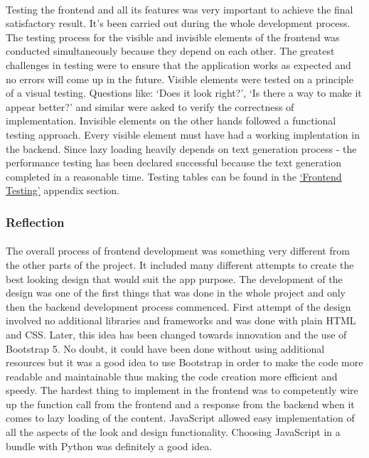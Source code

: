 \documentclass[12pt]{report}
\begin{document}
\paragraph{}
Testing the frontend and all its features was very important to achieve the final satisfactory result. It's been carried out
during the whole development process. The testing process for the visible and invisible elements of the frontend was conducted
simultaneously because they depend on each other. The greatest challenges in testing were to ensure that the application works
as expected and no errors will come up in the future. Visible elements were tested on a principle of a visual testing. 
Questions like: `Does it look right?', `Is there a way to make it appear better?' and similar were asked to verify the correctness of implementation.
Invisible elements on the other hands followed a functional testing approach. Every visible element must have had a working
implentation in the backend. Since lazy loading heavily depends on text generation process - the performance testing has been declared
successful because the text generation completed in a reasonable time. Testing tables can be found in the \hyperref[appendix:frontend_testing]{`Frontend Testing'} appendix
section.


\subsubsection*{Reflection}
\paragraph{}
The overall process of frontend development was something very different from the other parts of the project.
It included many different attempts to create the best looking design that would suit the app purpose. The development 
of the design was one of the first things that was done in the whole project and only then the backend development process
commenced. First attempt of the design involved no additional libraries and frameworks and was done with plain HTML and CSS.
Later, this idea has been changed towards innovation and the use of Bootstrap 5. No doubt, it could have been done without 
using additional resources but it was a good idea to use Bootstrap in order to make the code more readable and maintainable thus
making the code creation more efficient and speedy. The hardest thing to implement in the frontend was to competently
wire up the function call from the frontend and a response from the backend when it comes to lazy loading of the content.
JavaScript allowed easy implementation of all the aspects of the look and design functionality. Choosing JavaScript in a bundle
with Python was definitely a good idea.
\end{document}
